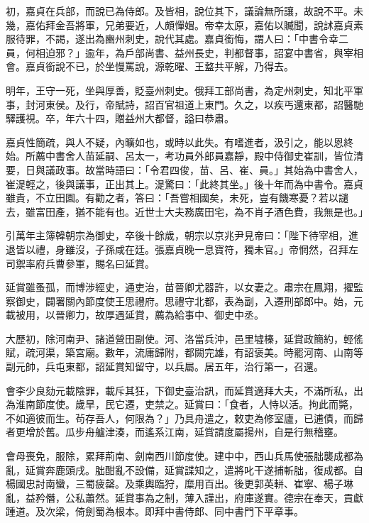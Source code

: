 \begin{pinyinscope}
 初，嘉貞在兵部，而說已為侍郎。及皆相，說位其下，議論無所讓，故說不平。未幾，嘉佑拜金吾將軍，兄弟要近，人頗憚媢。帝幸太原，嘉佑以贓聞，說訹嘉貞素服待罪，不謁，遂出為豳州刺史，說代其處。嘉貞銜悔，謂人曰：「中書令幸二員，何相迫邪？」逾年，為戶部尚書、益州長史，判都督事，詔宴中書省，與宰相會。嘉貞銜說不已，於坐慢罵說，源乾曜、王盩共平解，乃得去。



 明年，王守一死，坐與厚善，貶臺州刺史。俄拜工部尚書，為定州刺史，知北平軍事，封河東侯。及行，帝賦詩，詔百官祖道上東門。久之，以疾丐還東都，詔醫馳驛護視。卒，年六十四，贈益州大都督，謚曰恭肅。



 嘉貞性簡疏，與人不疑，內曠如也，或時以此失。有嗜進者，汲引之，能以恩終始。所薦中書舍人苗延嗣、呂太一，考功員外郎員嘉靜，殿中侍御史崔訓，皆位清要，日與議政事。故當時語曰：「令君四俊，苗、呂、崔、員。」其始為中書舍人，崔湜輕之，後與議事，正出其上。湜驚曰：「此終其坐。」後十年而為中書令。嘉貞雖貴，不立田園。有勸之者，答曰：「吾嘗相國矣，未死，豈有饑寒憂？若以譴去，雖富田產，猶不能有也。近世士大夫務廣田宅，為不肖子酒色費，我無是也。」



 引萬年主簿韓朝宗為御史，卒後十餘歲，朝宗以京兆尹見帝曰：「陛下待宰相，進退皆以禮，身雖沒，子孫咸在廷。張嘉貞晚一息寶符，獨未官。」帝惘然，召拜左司禦率府兵曹參軍，賜名曰延賞。



 延賞雖蚤孤，而博涉經史，通吏治，苗晉卿尤器許，以女妻之。肅宗在鳳翔，擢監察御史，闢署關內節度使王思禮府。思禮守北都，表為副，入遷刑部郎中。始，元載被用，以晉卿力，故厚遇延賞，薦為給事中、御史中丞。



 大歷初，除河南尹、諸道營田副使。河、洛當兵沖，邑里墟榛，延賞政簡約，輕傜賦，疏河渠，築宮廟。數年，流庸歸附，都闕完雄，有詔褒美。時罷河南、山南等副元帥，兵屯東都，詔延賞知留守，以兵屬。居五年，治行第一，召還。



 會李少良劾元載陰罪，載斥其狂，下御史臺治訊，而延賞適拜大夫，不滿所私，出為淮南節度使。歲旱，民它遷，吏禁之。延賞曰：「食者，人恃以活。拘此而斃，不如適彼而生。茍存吾人，何限為？」乃具舟遣之，敕吏為修室廬，已逋債，而歸者更增於舊。瓜步舟艫津湊，而遙系江南，延賞請度屬揚州，自是行無稽壅。



 會母喪免，服除，累拜荊南、劍南西川節度使。建中中，西山兵馬使張朏襲成都為亂，延賞奔鹿頭戌。朏酣亂不設備，延賞諜知之，遣將叱干遂捕斬朏，復成都。自楊國忠討南蠻，三蜀疲罄。及乘輿臨狩，糜用百出。後更郭英軿、崔寧、楊子琳亂，益矜僭，公私蕭然。延賞事為之制，薄入謹出，府庫遂實。德宗在奉天，貢獻踵道。及次梁，倚劍蜀為根本。即拜中書侍郎、同中書門下平章事。




\end{pinyinscope}
